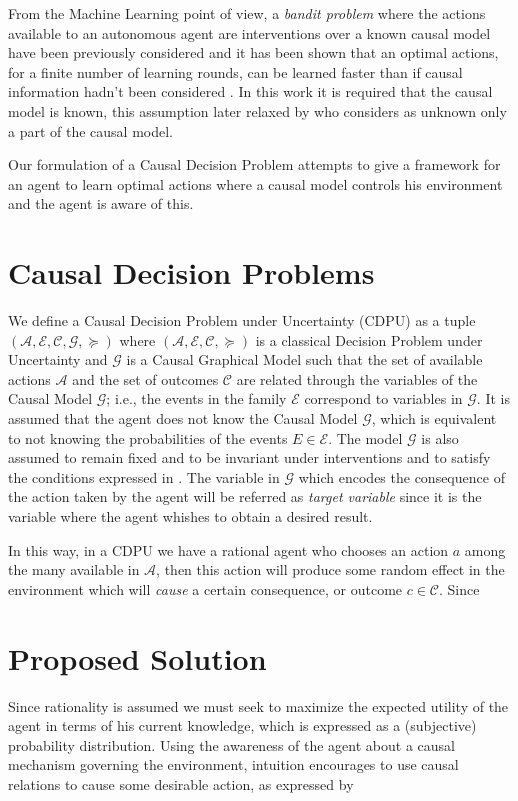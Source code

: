 \documentclass[letterpaper]{article} %
\theoremstyle{plain}
\begin{document}
From the Machine Learning point of view,  a \textit{bandit problem} where the actions available to an autonomous agent are interventions over a known causal model have been previously considered and it has been shown that an optimal actions, for a finite number of learning rounds, can be learned faster than if causal information hadn't been considered \cite{lattimoreNIPS2016}. In this work it is required that the causal model is known, this assumption later relaxed by \cite{sen2017identifying} who considers as unknown only a part of the causal model. 

Our formulation of a Causal Decision Problem attempts to give a framework for an agent to learn optimal actions where a causal model controls his environment and the agent is aware of this. 

\section{Causal Decision Problems}
We define a Causal Decision Problem under Uncertainty (CDPU) as a tuple $(\mathcal{A}, \mathcal{E}, \mathcal{C}, \mathcal{G}, \succeq)$ where  $(\mathcal{A}, \mathcal{E}, \mathcal{C}, \succeq)$ is a classical Decision Problem under Uncertainty \cite{bernardo2000bayesian} and $\mathcal{G}$ is a Causal Graphical Model \cite{sucar2015probabilistic} such that the set of available actions $\mathcal{A}$ and the set of outcomes $\mathcal{C}$ are related through the variables of the Causal Model $\mathcal{G}$; i.e., the events in the family $\mathcal{E}$ correspond to variables in $\mathcal{G}$. It is assumed that the agent does not know the Causal Model $\mathcal{G}$, which is equivalent to not knowing the probabilities of the events $E \in \mathcal{E}$. The model $\mathcal{G}$ is also assumed to remain fixed and to be invariant under interventions \cite{woodward2005making} and to satisfy the conditions expressed in \cite{spirtes2000causation}. The variable in $\mathcal{G}$ which encodes the consequence of the action taken by the agent will be referred as \textit{target variable} since it is the variable where the agent whishes to obtain a desired result. 

In this way, in a CDPU we have a rational agent who chooses an action $a$ among the many available in $\mathcal{A}$, then this action will produce some random effect in the environment which will \textit{cause} a certain consequence, or outcome $c \in \mathcal{C}$. Since 

\section{Proposed Solution}
Since rationality is assumed we must seek to maximize the expected utility of the agent in terms of his current knowledge, which is expressed as a (subjective) probability distribution. Using the awareness of the agent about a causal mechanism governing the environment, intuition encourages to use causal relations to cause some desirable action, as expressed by \cite{joyce1999foundations}
\end{document}
